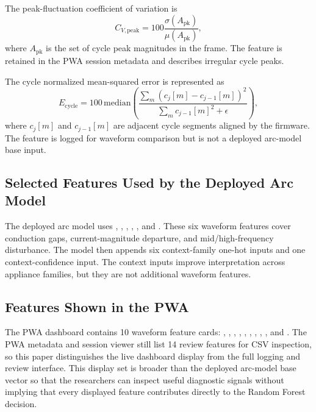 The peak-fluctuation coefficient of variation is
\begin{equation}
  C_{V,\mathrm{peak}} =
  100\frac{\sigma(A_{\mathrm{pk}})}{\mu(A_{\mathrm{pk}})} ,
  \label{eq:feature-peak-fluctuation}
\end{equation}
where $A_{\mathrm{pk}}$ is the set of cycle peak magnitudes in the frame. The
feature  is retained in the PWA session metadata and
describes irregular cycle peaks.

The cycle normalized mean-squared error is represented as
\begin{equation}
  E_{\mathrm{cycle}} =
  100\,\mathrm{median}
  \left(
  \frac{\sum_m (c_j[m]-c_{j-1}[m])^2}
       {\sum_m c_{j-1}[m]^2+\epsilon}
  \right),
  \label{eq:feature-cycle-nmse}
\end{equation}
where $c_j[m]$ and $c_{j-1}[m]$ are adjacent cycle segments aligned by the
firmware. The feature  is logged for waveform comparison
but is not a deployed arc-model base input.

\subsection{Selected Features Used by the Deployed Arc Model}
\label{sec:ch3-selected-arc-features}

The deployed arc model uses
, ,
, ,
, and . These
six waveform features cover conduction gaps, current-magnitude departure, and
mid/high-frequency disturbance. The model then appends six context-family
one-hot inputs and one context-confidence input. The context inputs improve
interpretation across appliance families, but they are not additional
waveform features.

\subsection{Features Shown in the PWA}
\label{sec:ch3-pwa-feature-display}

\begin{sloppypar}
The PWA dashboard contains 10 waveform feature cards:
, ,
,
, ,
, ,
, , and
. The PWA metadata and session viewer still list 14
review features for CSV inspection, so this paper distinguishes the live
dashboard display from the full logging and review interface. This display
set is broader than the deployed arc-model base vector so that the researchers
can inspect useful diagnostic signals without implying that every displayed
feature contributes directly to the Random Forest decision.
\end{sloppypar}
